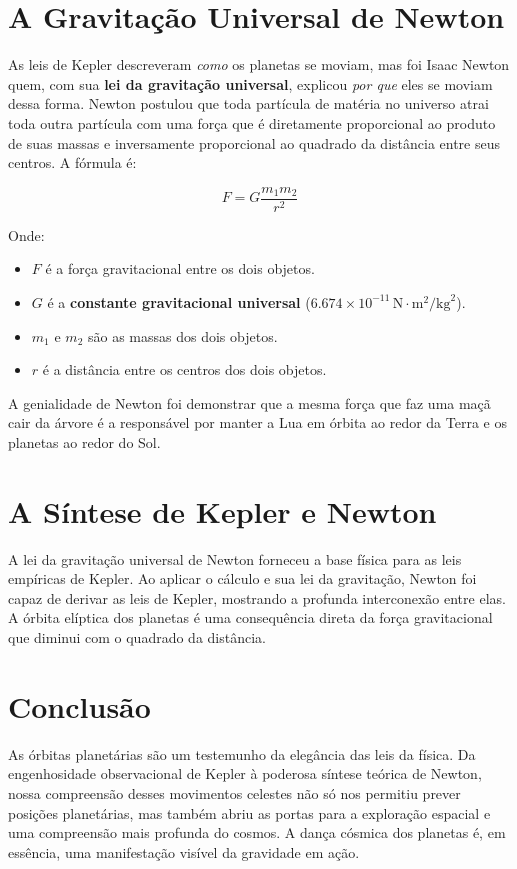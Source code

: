 \documentclass{article}
\begin{document}
\section{A Gravitação Universal de Newton}
As leis de Kepler descreveram \textit{como} os planetas se moviam, mas foi Isaac Newton quem, com sua \textbf{lei da gravitação universal}, explicou \textit{por que} eles se moviam dessa forma. Newton postulou que toda partícula de matéria no universo atrai toda outra partícula com uma força que é diretamente proporcional ao produto de suas massas e inversamente proporcional ao quadrado da distância entre seus centros. A fórmula é:

$$ F = G \frac{m_1 m_2}{r^2} $$

Onde:
\begin{itemize}
    \item $F$ é a força gravitacional entre os dois objetos.
    \item $G$ é a \textbf{constante gravitacional universal} ($6.674 \times 10^{-11} \, \text{N} \cdot \text{m}^2/\text{kg}^2$).
    \item $m_1$ e $m_2$ são as massas dos dois objetos.
    \item $r$ é a distância entre os centros dos dois objetos.
\end{itemize}

A genialidade de Newton foi demonstrar que a mesma força que faz uma maçã cair da árvore é a responsável por manter a Lua em órbita ao redor da Terra e os planetas ao redor do Sol.

\section{A Síntese de Kepler e Newton}
A lei da gravitação universal de Newton forneceu a base física para as leis empíricas de Kepler. Ao aplicar o cálculo e sua lei da gravitação, Newton foi capaz de derivar as leis de Kepler, mostrando a profunda interconexão entre elas. A órbita elíptica dos planetas é uma consequência direta da força gravitacional que diminui com o quadrado da distância.

\section{Conclusão}
As órbitas planetárias são um testemunho da elegância das leis da física. Da engenhosidade observacional de Kepler à poderosa síntese teórica de Newton, nossa compreensão desses movimentos celestes não só nos permitiu prever posições planetárias, mas também abriu as portas para a exploração espacial e uma compreensão mais profunda do cosmos. A dança cósmica dos planetas é, em essência, uma manifestação visível da gravidade em ação.
\end{document}

